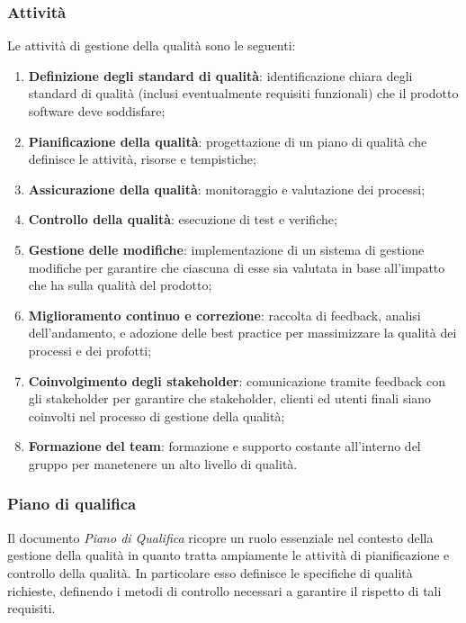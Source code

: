 \subsubsection{Attività}
Le attività di gestione della qualità sono le seguenti:
\begin{enumerate}
	\item \textbf{Definizione degli standard di qualità}: identificazione chiara degli standard di qualità
	      (inclusi eventualmente requisiti funzionali) che il prodotto software deve soddisfare;
	\item \textbf{Pianificazione della qualità}: progettazione di un piano di qualità che definisce le attività,
	      risorse e tempistiche;
	\item \textbf{Assicurazione della qualità}: monitoraggio e valutazione dei processi;
	\item \textbf{Controllo della qualità}: esecuzione di test e verifiche;
	\item \textbf{Gestione delle modifiche}: implementazione di un sistema di gestione modifiche per garantire che ciascuna di esse sia valutata
	      in base all'impatto che ha sulla qualità del prodotto;
	\item \textbf{Miglioramento continuo e correzione}: raccolta di feedback, analisi dell'andamento, e adozione delle
	      best practice per massimizzare la qualità dei processi e dei profotti;
	\item \textbf{Coinvolgimento degli stakeholder}: comunicazione tramite feedback con gli stakeholder
	      per garantire che stakeholder, clienti ed utenti finali siano coinvolti nel processo di gestione della qualità;
	\item \textbf{Formazione del team}: formazione e supporto costante all'interno del gruppo per manetenere un alto livello di qualità.
\end{enumerate}

\subsubsection{Piano di qualifica}
Il documento \textit{Piano di Qualifica} ricopre un ruolo essenziale nel contesto della gestione della qualità in quanto tratta ampiamente
le attività di pianificazione e controllo della qualità. In particolare esso definisce le specifiche di qualità
richieste, definendo i metodi di controllo necessari a garantire il rispetto di tali requisiti.

